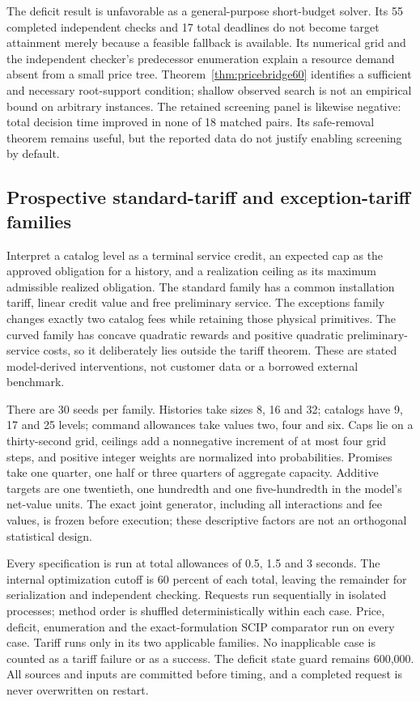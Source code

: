 The deficit result is unfavorable as a general-purpose short-budget solver. Its 55 completed independent checks and 17 total deadlines do not become target attainment merely because a feasible fallback is available. Its numerical grid and the independent checker's predecessor enumeration explain a resource demand absent from a small price tree. Theorem~\ref{thm:pricebridge60} identifies a sufficient and necessary root-support condition; shallow observed search is not an empirical bound on arbitrary instances. The retained screening panel is likewise negative: total decision time improved in none of 18 matched pairs. Its safe-removal theorem remains useful, but the reported data do not justify enabling screening by default.

\subsection{Prospective standard-tariff and exception-tariff families}
Interpret a catalog level as a terminal service credit, an expected cap as the approved obligation for a history, and a realization ceiling as its maximum admissible realized obligation. The standard family has a common installation tariff, linear credit value and free preliminary service. The exceptions family changes exactly two catalog fees while retaining those physical primitives. The curved family has concave quadratic rewards and positive quadratic preliminary-service costs, so it deliberately lies outside the tariff theorem. These are stated model-derived interventions, not customer data or a borrowed external benchmark.

There are 30 seeds per family. Histories take sizes 8, 16 and 32; catalogs have 9, 17 and 25 levels; command allowances take values two, four and six. Caps lie on a thirty-second grid, ceilings add a nonnegative increment of at most four grid steps, and positive integer weights are normalized into probabilities. Promises take one quarter, one half or three quarters of aggregate capacity. Additive targets are one twentieth, one hundredth and one five-hundredth in the model's net-value units. The exact joint generator, including all interactions and fee values, is frozen before execution; these descriptive factors are not an orthogonal statistical design.

Every specification is run at total allowances of 0.5, 1.5 and 3 seconds. The internal optimization cutoff is 60 percent of each total, leaving the remainder for serialization and independent checking. Requests run sequentially in isolated processes; method order is shuffled deterministically within each case. Price, deficit, enumeration and the exact-formulation SCIP comparator run on every case. Tariff runs only in its two applicable families. No inapplicable case is counted as a tariff failure or as a success. The deficit state guard remains 600,000. All sources and inputs are committed before timing, and a completed request is never overwritten on restart.

